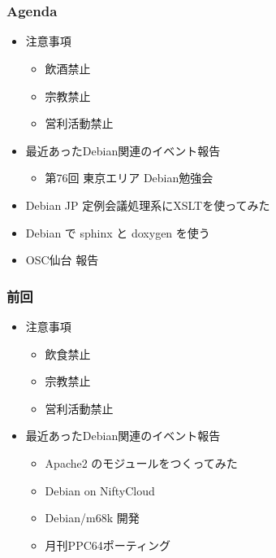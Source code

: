 \frame{\titlepage{}}

\section{}
\begin{frame}
 \frametitle{Agenda}
\begin{minipage}[t]{0.45\hsize}
  \begin{itemize}
  \item 注意事項
	\begin{itemize}
	 \item 飲酒禁止
	 \item 宗教禁止
	 \item 営利活動禁止
	\end{itemize}
   \item 最近あったDebian関連のイベント報告
	\begin{itemize}
	 \item 第76回 東京エリア Debian勉強会
	\end{itemize}
 \end{itemize}
\end{minipage} 
\begin{minipage}[t]{0.45\hsize}
 \begin{itemize}
  \item Debian JP 定例会議処理系にXSLTを使ってみた
  \item Debian で sphinx と doxygen を使う
  \item OSC仙台 報告
 \end{itemize}
\end{minipage}
\end{frame}

\begin{frame}
 \frametitle{前回}
\begin{minipage}[t]{0.45\hsize}
  \begin{itemize}
  \item 注意事項
	\begin{itemize}
	 \item 飲食禁止
	 \item 宗教禁止
	 \item 営利活動禁止
	\end{itemize}
  \end{itemize}
\end{minipage}
\begin{minipage}[t]{0.45\hsize}
\begin{itemize}
  \item 最近あったDebian関連のイベント報告
 \begin{itemize}
  \item Apache2 のモジュールをつくってみた
  \item Debian on NiftyCloud
  \item Debian/m68k 開発
  \item 月刊PPC64ポーティング
 \end{itemize}
 \end{itemize}
\end{minipage}
\end{frame}


